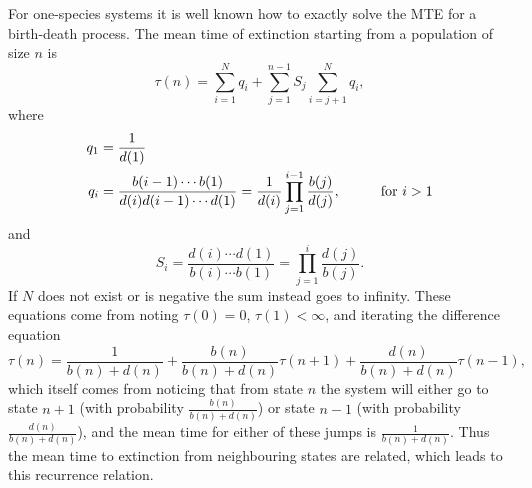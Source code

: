For one-species systems it is well known how to exactly solve the MTE for a birth-death process. 
The mean time of extinction starting from a population of size $n$ is \cite{Nisbet1982,Palamara2013}
\begin{equation}
\tau(n) = \sum_{i=1}^{N}q_i + \sum_{j=1}^{n-1} S_j\sum_{i=j+1}^{N}q_i,
\label{analytic_mte}
\end{equation}
where
\begin{align}
q_1 &= \frac{1}{d(1)} \\
q_i &= \frac{b(i-1)\cdots b(1)}{d(i)d(i-1)\cdots d(1)} = \frac{1}{d(i)}\prod_{j=1}^{i-1}\frac{b(j)}{d(j)}, \hspace{1cm} \text{for }i > 1 \notag
\end{align}
and
\begin{equation}
S_i = \frac{d(i)\cdots d(1)}{b(i)\cdots b(1)} = \prod_{j=1}^{i}\frac{d(j)}{b(j)}.  
\end{equation}
If $N$ does not exist or is negative the sum instead goes to infinity. 
These equations come from noting $\tau(0)=0$, $\tau(1)<\infty$, and iterating the difference equation \cite{Nisbet1982,Palamara2013}
\begin{equation}
\tau(n) = \frac{1}{b(n)+d(n)} 
+ \frac{b(n)}{b(n)+d(n)}\tau(n+1) 
+ \frac{d(n)}{b(n)+d(n)}\tau(n-1),
 \label{mte-recurrence}
\end{equation}
which itself comes from noticing that from state $n$ the system will either go to state $n+1$ (with probability $\frac{b(n)}{b(n)+d(n)}$) or state $n-1$ (with probability $\frac{d(n)}{b(n)+d(n)}$), and the mean time for either of these jumps is $\frac{1}{b(n)+d(n)}$. 
Thus the mean time to extinction from neighbouring states are related, which leads to this recurrence relation. 

